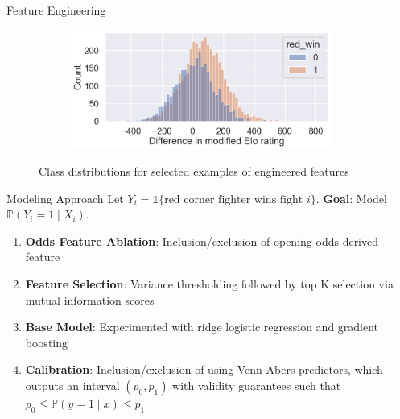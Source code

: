\documentclass[final]{beamer}
\newlength{\sepwidth}
\newlength{\colwidth}
\newcommand{\separatorcolumn}{\begin{column}{\sepwidth}\end{column}}
\begin{document}
\begin{frame}[t]
\begin{columns}[t]
\begin{column}{\colwidth}
\begin{block}{Feature Engineering}
\begin{figure}
\begin{subfigure}{.49\linewidth}
        \end{subfigure}
        \begin{subfigure}{.49\linewidth}
            \centering
            \includegraphics[width=\linewidth]{figures/elo_modified.png}
        \end{subfigure}
        \caption{Class distributions for selected examples of engineered features}
    \end{figure}

  \end{block}

  \begin{block}{Modeling Approach}
    Let $Y_i = \mathds{1}\{\text{red corner fighter wins fight } i\}$. \textbf{Goal}: Model $\mathbb{P}(Y_i = 1 \mid X_i)$.
    
    \begin{enumerate}
        \item \textbf{Odds Feature Ablation}: Inclusion/exclusion of opening odds-derived feature

        \item \textbf{Feature Selection}: Variance thresholding followed by top K selection via mutual information scores

        \item \textbf{Base Model}: Experimented with ridge logistic regression and gradient boosting

        \item \textbf{Calibration}: Inclusion/exclusion of using Venn-Abers predictors, which outputs an interval $(p_0, p_1)$ with validity guarantees such that
        $p_0 \leq \mathbb{P}(y = 1 \mid x) \leq p_1$
    \end{enumerate}

  \end{block}

\end{column}

\separatorcolumn


\end{columns}
\end{frame}
\end{document}
